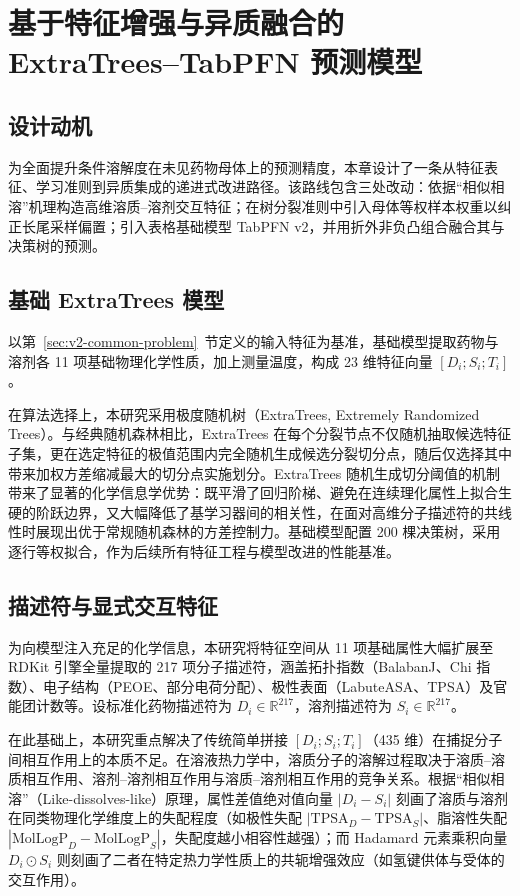 \section{基于特征增强与异质融合的 ExtraTrees--TabPFN 预测模型}\label{sec:v2-methods}

\subsection{设计动机}

为全面提升条件溶解度在未见药物母体上的预测精度，本章设计了一条从特征表征、学习准则到异质集成的递进式改进路径。该路线包含三处改动：依据“相似相溶”机理构造高维溶质--溶剂交互特征；在树分裂准则中引入母体等权样本权重以纠正长尾采样偏置；引入表格基础模型 TabPFN v2，并用折外非负凸组合融合其与决策树的预测。

\subsection{基础 ExtraTrees 模型}

以第~\ref{sec:v2-common-problem}~节定义的输入特征为基准，基础模型提取药物与溶剂各 11 项基础物理化学性质，加上测量温度，构成 23 维特征向量 $[D_i; S_i; T_i]$。

在算法选择上，本研究采用极度随机树（ExtraTrees, Extremely Randomized Trees\cite{extratrees2006}）。与经典随机森林相比，ExtraTrees 在每个分裂节点不仅随机抽取候选特征子集，更在选定特征的极值范围内完全随机生成候选分裂切分点，随后仅选择其中带来加权方差缩减最大的切分点实施划分。ExtraTrees 随机生成切分阈值的机制带来了显著的化学信息学优势：既平滑了回归阶梯、避免在连续理化属性上拟合生硬的阶跃边界，又大幅降低了基学习器间的相关性，在面对高维分子描述符的共线性时展现出优于常规随机森林的方差控制力。基础模型配置 200 棵决策树，采用逐行等权拟合，作为后续所有特征工程与模型改进的性能基准。

\subsection{描述符与显式交互特征}

为向模型注入充足的化学信息，本研究将特征空间从 11 项基础属性大幅扩展至 RDKit 引擎全量提取的 217 项分子描述符，涵盖拓扑指数（BalabanJ、Chi 指数）、电子结构（PEOE、部分电荷分配）、极性表面（LabuteASA、TPSA）及官能团计数等。设标准化药物描述符为 $D_i \in \mathbb{R}^{217}$，溶剂描述符为 $S_i \in \mathbb{R}^{217}$。

在此基础上，本研究重点解决了传统简单拼接 $[D_i; S_i; T_i]$（435 维）在捕捉分子间相互作用上的本质不足。在溶液热力学中，溶质分子的溶解过程取决于溶质--溶质相互作用、溶剂--溶剂相互作用与溶质--溶剂相互作用的竞争关系。根据“相似相溶”（Like-dissolves-like）原理，属性差值绝对值向量 $|D_i - S_i|$ 刻画了溶质与溶剂在同类物理化学维度上的失配程度（如极性失配 $|\mathrm{TPSA}_D - \mathrm{TPSA}_S|$、脂溶性失配 $|\mathrm{MolLogP}_D - \mathrm{MolLogP}_S|$，失配度越小相容性越强）；而 Hadamard 元素乘积向量 $D_i \odot S_i$ 则刻画了二者在特定热力学性质上的共轭增强效应（如氢键供体与受体的交互作用）。

